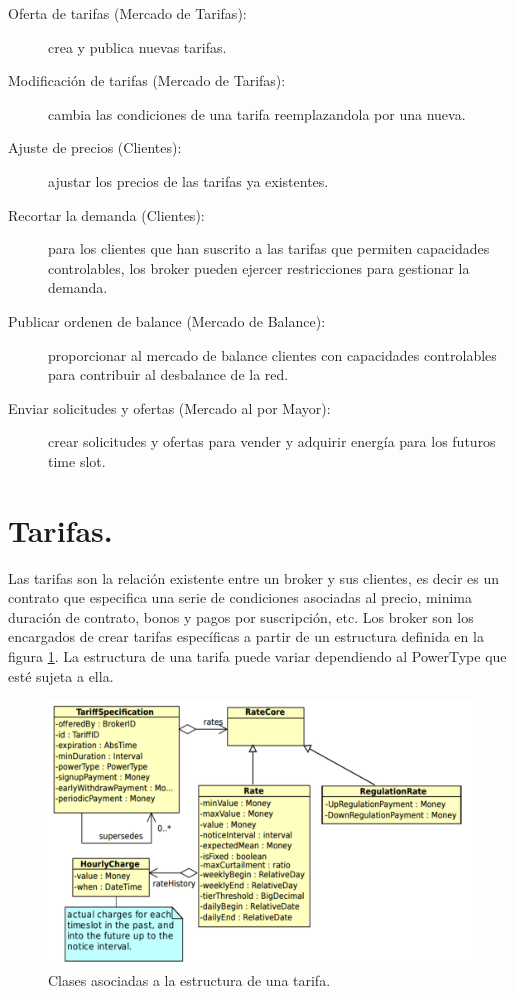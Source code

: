 \begin{description}
    \item [Oferta de tarifas (Mercado de Tarifas):] crea y publica nuevas tarifas.
    \item [Modificación de tarifas (Mercado de Tarifas):]  cambia las condiciones de una tarifa reemplazandola por una nueva.
    \item [Ajuste de precios (Clientes):] ajustar los precios de las tarifas ya existentes.
    \item [Recortar la demanda (Clientes):] para los clientes que han suscrito a las tarifas que permiten capacidades controlables, los broker pueden ejercer restricciones para gestionar la demanda.
    \item [Publicar ordenen de balance (Mercado de Balance):] proporcionar al mercado de balance clientes con capacidades controlables para contribuir al desbalance de la red.
    \item [Enviar solicitudes y ofertas (Mercado al por Mayor):]  crear solicitudes y ofertas para vender y adquirir energía para los futuros time slot.
\end{description}

\section{Tarifas.}
\label{tariff}
Las tarifas son la relación existente entre un broker y sus clientes, es decir es un contrato que especifica una serie de condiciones asociadas al precio, minima duración de contrato, bonos y pagos por suscripción, etc. Los broker son los encargados de crear tarifas específicas a partir de un estructura definida  en la figura \ref{tariff}. La estructura de una tarifa puede variar dependiendo al PowerType que esté sujeta a ella.

\begin{figure}[h!]
    \centering
    \includegraphics[width=13cm]{img/tariffstructe.png}
    \caption{Clases asociadas a la estructura de una tarifa.}
    \label{tariff}
\end{figure}

